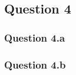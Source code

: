 \subsection{Question 4}
\label{subsec:314}

\subsubsection{Question 4.a}
\label{subsubsec:314a}

\subsubsection{Question 4.b}
\label{subsubsec:314b}
